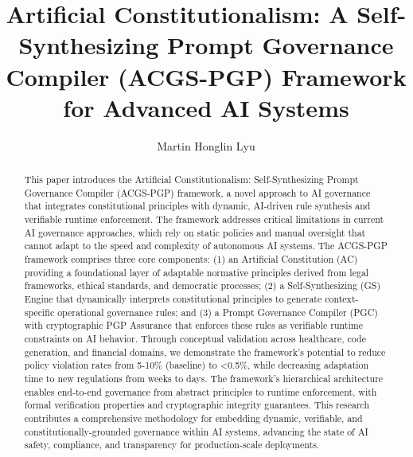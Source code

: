 \documentclass[sigconf,review,anonymous=false]{acmart} %
\begin{document}
\title{Artificial Constitutionalism: A Self-Synthesizing Prompt Governance Compiler (ACGS-PGP) Framework for Advanced AI Systems}

\author{Martin Honglin Lyu}


\renewcommand{\shortauthors}{Martin Honglin Lyu} %

\begin{abstract} %
This paper introduces the Artificial Constitutionalism: Self-Synthesizing Prompt Governance Compiler (ACGS-PGP) framework, a novel approach to AI governance that integrates constitutional principles with dynamic, AI-driven rule synthesis and verifiable runtime enforcement. The framework addresses critical limitations in current AI governance approaches, which rely on static policies and manual oversight that cannot adapt to the speed and complexity of autonomous AI systems. The ACGS-PGP framework comprises three core components: (1) an Artificial Constitution (AC) providing a foundational layer of adaptable normative principles derived from legal frameworks, ethical standards, and democratic processes; (2) a Self-Synthesizing (GS) Engine that dynamically interprets constitutional principles to generate context-specific operational governance rules; and (3) a Prompt Governance Compiler (PGC) with cryptographic PGP Assurance that enforces these rules as verifiable runtime constraints on AI behavior. Through conceptual validation across healthcare, code generation, and financial domains, we demonstrate the framework's potential to reduce policy violation rates from 5-10\% (baseline) to <0.5\%, while decreasing adaptation time to new regulations from weeks to days. The framework's hierarchical architecture enables end-to-end governance from abstract principles to runtime enforcement, with formal verification properties and cryptographic integrity guarantees. This research contributes a comprehensive methodology for embedding dynamic, verifiable, and constitutionally-grounded governance within AI systems, advancing the state of AI safety, compliance, and transparency for production-scale deployments.
\end{abstract}
\end{document}
